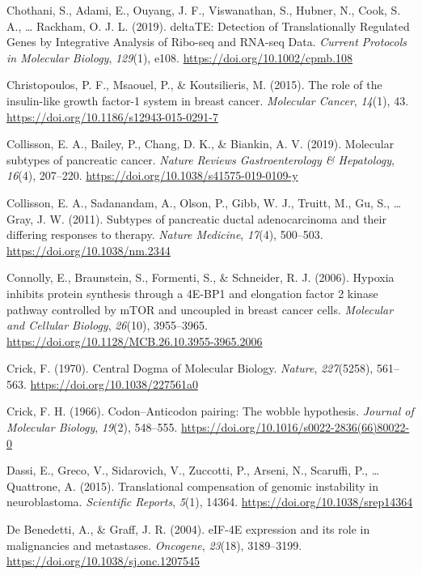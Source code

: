 \documentclass[12pt,openany]{book}
\begin{document}
\hypertarget{ref-Chothani2019}{}
Chothani, S., Adami, E., Ouyang, J. F., Viswanathan, S., Hubner, N.,
Cook, S. A., \ldots{} Rackham, O. J. L. (2019). deltaTE: Detection of
Translationally Regulated Genes by Integrative Analysis of Ribo-seq and
RNA-seq Data. \emph{Current Protocols in Molecular Biology},
\emph{129}(1), e108. \url{https://doi.org/10.1002/cpmb.108}

\hypertarget{ref-Christopoulos2015}{}
Christopoulos, P. F., Msaouel, P., \& Koutsilieris, M. (2015). The role
of the insulin-like growth factor-1 system in breast cancer.
\emph{Molecular Cancer}, \emph{14}(1), 43.
\url{https://doi.org/10.1186/s12943-015-0291-7}

\hypertarget{ref-Collisson2019}{}
Collisson, E. A., Bailey, P., Chang, D. K., \& Biankin, A. V. (2019).
Molecular subtypes of pancreatic cancer. \emph{Nature Reviews
Gastroenterology \& Hepatology}, \emph{16}(4), 207--220.
\url{https://doi.org/10.1038/s41575-019-0109-y}

\hypertarget{ref-Collisson2011}{}
Collisson, E. A., Sadanandam, A., Olson, P., Gibb, W. J., Truitt, M.,
Gu, S., \ldots{} Gray, J. W. (2011). Subtypes of pancreatic ductal
adenocarcinoma and their differing responses to therapy. \emph{Nature
Medicine}, \emph{17}(4), 500--503. \url{https://doi.org/10.1038/nm.2344}

\hypertarget{ref-Connolly2006}{}
Connolly, E., Braunstein, S., Formenti, S., \& Schneider, R. J. (2006).
Hypoxia inhibits protein synthesis through a 4E-BP1 and elongation
factor 2 kinase pathway controlled by mTOR and uncoupled in breast
cancer cells. \emph{Molecular and Cellular Biology}, \emph{26}(10),
3955--3965. \url{https://doi.org/10.1128/MCB.26.10.3955-3965.2006}

\hypertarget{ref-Crick1970}{}
Crick, F. (1970). Central Dogma of Molecular Biology. \emph{Nature},
\emph{227}(5258), 561--563. \url{https://doi.org/10.1038/227561a0}

\hypertarget{ref-Crick1966}{}
Crick, F. H. (1966). Codon--Anticodon pairing: The wobble hypothesis.
\emph{Journal of Molecular Biology}, \emph{19}(2), 548--555.
\url{https://doi.org/10.1016/s0022-2836(66)80022-0}

\hypertarget{ref-Dassi2015}{}
Dassi, E., Greco, V., Sidarovich, V., Zuccotti, P., Arseni, N.,
Scaruffi, P., \ldots{} Quattrone, A. (2015). Translational compensation
of genomic instability in neuroblastoma. \emph{Scientific Reports},
\emph{5}(1), 14364. \url{https://doi.org/10.1038/srep14364}

\hypertarget{ref-DeBenedetti2004}{}
De Benedetti, A., \& Graff, J. R. (2004). eIF-4E expression and its role
in malignancies and metastases. \emph{Oncogene}, \emph{23}(18),
3189--3199. \url{https://doi.org/10.1038/sj.onc.1207545}
\end{document}
